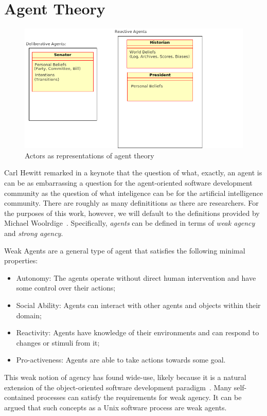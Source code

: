 \documentclass{sig-alternate}
\newcounter{over}
\newenvironment{smallitem}
 {\setlength{\topsep}{0pt}
  \setlength{\partopsep}{0pt}
  \setlength{\parskip}{0pt}
  \begin{itemize}
   \setlength{\leftmargin}{.2in}
  \setlength{\parsep}{0pt}
  \setlength{\parskip}{0pt}
  \setlength{\itemsep}{0pt}}
 {\end{itemize}}
\newcommand{\bi}{\begin{smallitem}}
\newcommand{\ei}{\end{smallitem}}
\begin{document}
\section{Agent Theory}

\begin{figure}[!t]
\begin{center}
\includegraphics[width=4.5in]{actory2.png}
\end{center}
\caption{Actors as representations of agent theory}
\label{fig:actory2}
\end{figure}

Carl Hewitt remarked in a keynote that the question of what, exactly, 
an agent
is can be as embarrassing a question for the agent-oriented software
development community as the question of what inteligence can be for
the artificial intelligence community. There are
roughly as many definititions as there are researchers. For the
purposes of this work, however, we will default to the definitions 
provided by Michael Woolrdige~\cite{woolridge}. Specifically, {\em agents} can be defined in terms of {\em weak agency} and {\em strong agency}.

Weak Agents are a general type of agent that satisfies the following 
minimal properties: 
\bi
\item Autonomy: The agents operate without direct human intervention and have some control over their actions;
\item Social Ability: Agents can interact with other agents and 
objects within their domain;
\item Reactivity: Agents have knowledge of their environments and can
respond to changes or stimuli from it;
\item Pro-activeness: Agents are able to take actions towards some goal.
\ei 
This weak notion of agency has found wide-use, likely because it is 
a natural extension of the object-oriented software development
paradigm~\cite{Agha86, Agha93}. Many self-contained
processes can satisfy the requirements for weak agency. It can be argued
that such concepts as a Unix software process are weak agents. 
\end{document}
